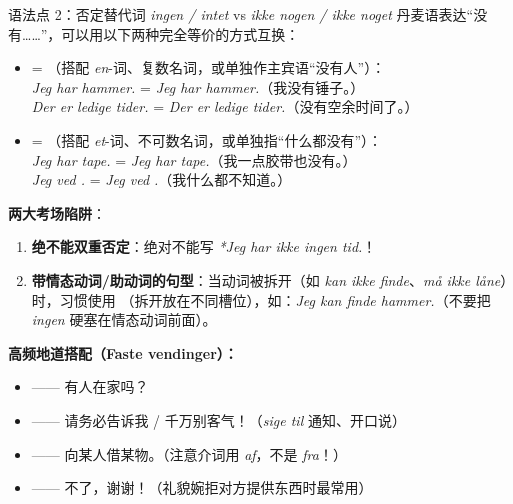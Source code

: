 \begin{grammatikbox}{语法点 2：否定替代词 \textit{ingen / intet} vs \textit{ikke nogen / ikke noget}}
丹麦语表达“没有……”，可以用以下两种完全等价的方式互换：
\begin{itemize}
  \item {} = （搭配 \textit{en}-词、复数名词，或单独作主宾语“没有人”）：\\
    \textit{Jeg har  hammer.} = \textit{Jeg har  hammer.}（我没有锤子。）\\
    \textit{Der er  ledige tider.} = \textit{Der er  ledige tider.}（没有空余时间了。）
  \item {} = （搭配 \textit{et}-词、不可数名词，或单独指“什么都没有”）：\\
    \textit{Jeg har  tape.} = \textit{Jeg har  tape.}（我一点胶带也没有。）\\
    \textit{Jeg ved .} = \textit{Jeg ved .}（我什么都不知道。）
\end{itemize}

\textbf{两大考场陷阱}：
\begin{enumerate}
  \item \textbf{绝不能双重否定}：绝对不能写 \textit{*Jeg har ikke ingen tid.}！
  \item \textbf{带情态动词/助动词的句型}：当动词被拆开（如 \textit{kan ikke finde}、\textit{må ikke låne}）时，习惯使用 （拆开放在不同槽位），如：\textit{Jeg kan  finde  hammer.}（不要把 \textit{ingen} 硬塞在情态动词前面）。
\end{enumerate}

\textbf{高频地道搭配（Faste vendinger）：}
\begin{itemize}
  \item {} —— 有人在家吗？
  \item {} —— 请务必告诉我 / 千万别客气！（\textit{sige til} 通知、开口说）
  \item {} —— 向某人借某物。（注意介词用 \textit{af}，不是 \textit{fra}！）
  \item {} —— 不了，谢谢！（礼貌婉拒对方提供东西时最常用）
\end{itemize}
\end{grammatikbox}


